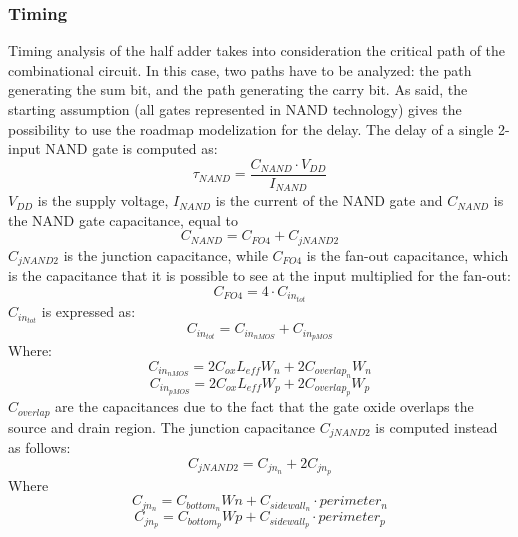 \subsubsection{Timing}
Timing analysis of the half adder takes into consideration the critical path of the combinational circuit. In this case, two paths have to be analyzed: the path generating the sum bit, and the path generating the carry bit. 
As said, the starting assumption (all gates represented in NAND technology) gives the possibility to use the roadmap modelization for the delay. The delay of a single 2-input NAND gate is computed as:
\begin{equation}
\tau_{NAND} = \frac{C_{NAND}\cdot V_{DD}}{I_{NAND}}
\end{equation}
$V_{DD}$ is the supply voltage, $I_{NAND}$ is the current of the NAND gate and $C_{NAND}$ is the NAND gate capacitance, equal to
\begin{equation}
C_{NAND} = C_{FO4} + C_{jNAND2}
\end{equation}
$C_{jNAND2}$ is the junction capacitance, while $C_{FO4}$ is the fan-out capacitance, which is the capacitance that it is possible to see at the input multiplied for the fan-out:
\begin{equation}
C_{FO4} = 4\cdot C_{in_{tot}}
\end{equation}
$C_{in_{tot}}$ is expressed as:
\begin{equation}
C_{in_{tot}} = C_{in_{nMOS}} + C_{in_{pMOS}}
\end{equation}
Where:
\begin{equation}
C_{in_{nMOS}} = 2C_{ox}L_{eff}W_n + 2C_{overlap_{n}}W_n
\end{equation}
\begin{equation}
C_{in_{pMOS}} = 2C_{ox}L_{eff}W_p + 2C_{overlap_{p}}W_p
\end{equation}
$C_{overlap}$ are the capacitances due to the fact that the gate oxide overlaps the source and drain region.
The junction capacitance $C_{jNAND2}$ is computed instead as follows:
\begin{equation}
C_{jNAND2} = C_{jn_n} + 2C_{jn_p}
\end{equation}
Where
\begin{equation}
C_{jn_n} = C_{bottom_n}Wn + C_{sidewall_n}\cdot perimeter_n
\end{equation}
\begin{equation}
C_{jn_p} = C_{bottom_p}Wp + C_{sidewall_p}\cdot perimeter_p
\end{equation}

